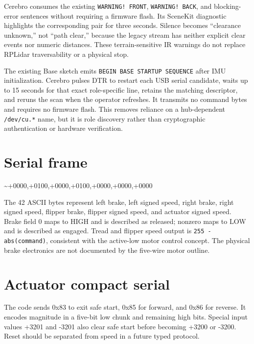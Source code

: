 \documentclass[10pt,openany]{book}
\begin{document}
Cerebro consumes the existing \texttt{WARNING! FRONT}, \texttt{WARNING! BACK}, and blocking-error sentences without requiring a firmware flash. Its SceneKit diagnostic highlights the corresponding pair for three seconds. Silence becomes ``clearance unknown,'' not ``path clear,'' because the legacy stream has neither explicit clear events nor numeric distances. These terrain-sensitive IR warnings do not replace RPLidar traversability or a physical stop.

The existing Base sketch emits \texttt{BEGIN BASE STARTUP SEQUENCE} after IMU initialization. Cerebro pulses DTR to restart each USB serial candidate, waits up to 15 seconds for that exact role-specific line, retains the matching descriptor, and reruns the scan when the operator refreshes. It transmits no command bytes and requires no firmware flash. This removes reliance on a hub-dependent \texttt{/dev/cu.*} name, but it is role discovery rather than cryptographic authentication or hardware verification.

\section{Serial frame}

\begin{center}
\begin{tcolorbox}[colback=ROBInk,colframe=ROBAccent,width=0.96\textwidth,arc=0mm]
{\ttfamily\color{white}\large
\textcolor{ROBAccent}{\textasciitilde}+0000,+0100,+0000,+0100,+0000,+0000,+0000}
\end{tcolorbox}
\end{center}

The 42 ASCII bytes represent left brake, left signed speed, right brake, right signed speed, flipper brake, flipper signed speed, and actuator signed speed. Brake field 0 maps to HIGH and is described as released; nonzero maps to LOW and is described as engaged. Tread and flipper speed output is \texttt{255 - abs(command)}, consistent with the active-low motor control concept. The physical brake electronics are not documented by the five-wire motor outline.

\section{Actuator compact serial}

The code sends 0x83 to exit safe start, 0x85 for forward, and 0x86 for reverse. It encodes magnitude in a five-bit low chunk and remaining high bits. Special input values +3201 and -3201 also clear safe start before becoming +3200 or -3200. Reset should be separated from speed in a future typed protocol.
\end{document}
